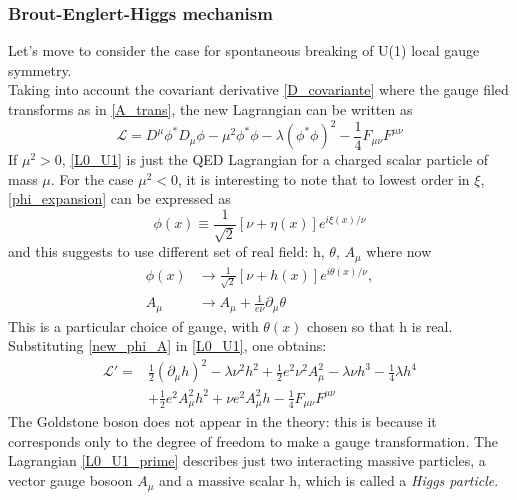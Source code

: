 \subsubsection{Brout-Englert-Higgs mechanism}%
Let's move to consider the case for spontaneous breaking of U(1) local gauge symmetry.\\
Taking into account the covariant derivative \ref{D_covariante} where the gauge filed transforms as in \ref{A_trans}, the new Lagrangian can be written as
\begin{equation}
\mathcal{L} = D^{\mu}\phi^{*}D_{\mu}\phi -\mu^{2}\phi^{*}\phi-\lambda(\phi^{*}\phi)^{2}-\frac{1}{4}F_{\mu\nu}F^{\mu\nu}
\label{L0_U1}
\end{equation}
If $\mu^{2} > 0$, \ref{L0_U1} is just the QED Lagrangian for a charged scalar particle of mass $\mu$.
For the case $\mu^{2} < 0$, it is interesting to note that to lowest order in $\xi$, \ref{phi_expansion} can be expressed as
\begin{equation}
\phi(x) \equiv \frac{1}{\sqrt{2}}[\nu+\eta(x)]e^{i\xi(x)/\nu}
\label{phi_expansion_2}
\end{equation}
and this suggests to use different set of real field: h, $\theta$, $A_{\mu}$ where now
\begin{equation}
\begin{split}
\phi(x) &\to \frac{1}{\sqrt{2}}[\nu+h(x)]e^{i\theta(x)/\nu}, \\
A_{\mu} &\to A_{\mu}+ \frac{1}{e\nu}\partial_{\mu}\theta
\end{split}
\label{new_phi_A}
\end{equation}
This is a particular choice of gauge, with $\theta(x)$ chosen so that h is real. Substituting \ref{new_phi_A} in \ref{L0_U1}, one obtains:
\begin{equation}
\begin{split}
\mathcal{L}' = &\frac{1}{2}(\partial_{\mu}h)^{2}-\lambda\nu^{2}h^{2}+\frac{1}{2}e^{2}\nu^{2}A_{\mu}^{2}-\lambda\nu h^{3}-\frac{1}{4}\lambda h^{4}\\
&+\frac{1}{2}e^{2}A_{\mu}^{2}h^{2}+\nu e^{2}A_{\mu}^{2}h-\frac{1}{4}F_{\mu\nu}F^{\mu\nu}
\end{split}
\label{L0_U1_prime}
\end{equation}
The Goldstone boson does not appear in the theory: this is because it corresponds only to the degree of freedom to make a gauge transformation. The Lagrangian \ref{L0_U1_prime} describes just two interacting massive particles, a vector gauge bosoon $A_{\mu}$ and a massive scalar h, which is called a \textit{Higgs particle}. 
